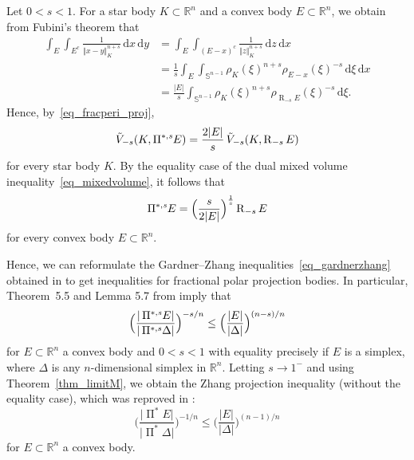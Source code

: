 \documentclass{amsart}
\newcommand{\opp}{\operatorname{\Pi}^*\!}
\newcommand{\ofpp}[1]{\operatorname{\Pi^{\ast,{\it #1}}}\!}
\newcommand{\omr}[1]{\operatorname{R}_{#1}}
\newcommand{\Svtex}{\Delta}
\newcommand{\snvtex}{{\mathbb S}^{n-1}}
\newcommand{\dvtex}{\,\mathrm{d}}
\newcommand{\vol}[1]{ \vert #1\vert}
\begin{document}
Let $0<s<1$. For a star body $K\subset \mathbb R^{n}$ and a convex body
$E\subset \mathbb R^{n}$, we obtain from Fubini's theorem that
%
\begin{align}
\int _{E} \int _{E^{c}} \frac{1}{\Vert x-y\Vert _{K}^{n+s}}\dvtex x\dvtex y &=
\int _{E} \int _{(E-x)^{c}} \frac{1}{\Vert z\Vert _{K}^{n+s}}\dvtex z\dvtex x
\nonumber \\
\label{eq_Rms}
&=\frac{1}{s} \int _{E} \int _{\snvtex} \rho _{K}(\xi )^{n+s}\rho _{E-x}(
\xi )^{-s}\dvtex \xi \dvtex x
\\
&=\frac{\vol{E}}{s} \int _{\snvtex} \rho _{K}(\xi )^{n+s}\rho _{\omr {-s} E}(
\xi )^{-s}\dvtex \xi .
\nonumber \end{align}
%
Hence, by~\eqref{eq_fracperi_proj},
%
\begin{equation}
\tilde V_{-s}(K, \ofpp{s} E) =\frac {2\vol{E}}{s}\, \tilde V_{-s}(K,
\omr {-s} E)
\nonumber \end{equation}
%
for every star body $K$. By the equality case of the dual mixed volume
inequality~\eqref{eq_mixedvolume}, it follows that
%
\begin{equation}
\ofpp{s} E =\Big(\frac {s}{2\vol{E}}\Big)^{\frac{1}{s}} \omr {-s} E
\nonumber \end{equation}
%
for every convex body $E\subset \mathbb R^{n}$.

Hence, we can reformulate the Gardner--Zhang inequalities~\eqref{eq_gardnerzhang} obtained in \cite{GZ} to get inequalities for fractional
polar projection bodies. In particular, Theorem~5.5 and Lemma 5.7 from
\cite{GZ} imply that
%
\begin{equation}
\Big(\frac{\vol{\ofpp{s} E}}{\vol{\ofpp{s} \Svtex}}\Big)^{- s/ n} \le
\Big(\frac{\vol{ E}}{\vol{\Svtex}}\Big)^{ {(n-s)}/n}
\nonumber \end{equation}
%
for $E\subset \mathbb R^{n}$ a convex body and $0<s<1$ with equality precisely
if $E$ is a simplex, where $\Svtex $ is any $n$-dimensional simplex in
$\mathbb R^{n}$. Letting $s\to 1^{-}$ and using Theorem~\ref{thm_limitM},
we obtain the Zhang projection inequality \cite{Zhang91} (without the equality
case), which was reproved in \cite{GZ}:
%
\begin{equation}
\Big(\frac{\vol{\opp E}}{\vol{\opp \Svtex}}\Big)^{- 1/ n} \le \Big(
\frac{\vol{ E}}{\vol{\Svtex}}\Big)^{ {(n-1)}/n}
\nonumber \end{equation}
%
for $E\subset \mathbb R^{n}$ a convex body.
\end{document}
